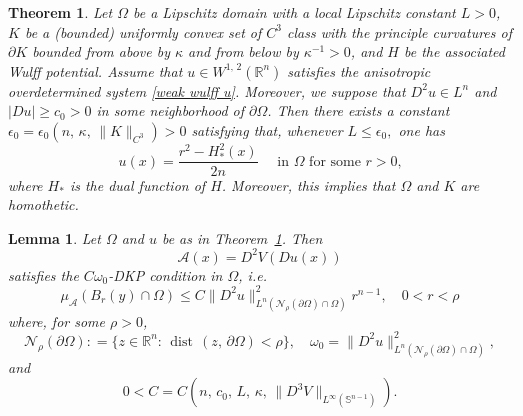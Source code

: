 \documentclass[10pt,a4paper]{amsart}
\newtheorem{thm}{Theorem}
\newtheorem{lem}{Lemma}
\def\dist{{\mathop\mathrm{\,dist\,}}}
\def\ez{\epsilon}
\begin{document}
\begin{thm}\label{main thm 2}
    Let $\Omega$ be a Lipschitz domain with a local Lipschitz constant $L>0$, $K$ be a (bounded) uniformly convex set of $C^{3}$ class with the principle curvatures of $\partial K$ bounded from above by $\kappa$ and from below by $\kappa^{-1}>0$, 
    and $H$ be the associated Wulff potential.
    Assume that $u\in W^{1,\,2}(\mathbb R^n) $
    satisfies the anisotropic overdetermined system \eqref{weak wulff u}. Moreover, we suppose that $D^2u\in L^n$ and $|Du|\ge c_0>0$ in some neighborhood of $\partial \Omega$. Then there exists a constant $\ez_0=\ez_0(n,\,\kappa,\,\|K\|_{C^{3}})>0$ satisfying that, whenever
    $ L \le \ez_0,$
    one has
    $$u(x)=\frac{r^2-H_*^2(x)}{2n} \quad \text{ in  }  \Omega  \text{ for some $r>0$,}$$
where $H_*$ is the dual function of $H$. Moreover, this implies that $\Omega$ and $K$ are homothetic. 
\end{thm}

\begin{lem}\label{A DKP}
    Let $\Omega$ and $u$ be  as in Theorem~\ref{main thm 2}. Then 
    $$\mathcal A(x)= D^2V( Du(x))$$
    satisfies the $C\omega_0$-DKP condition in $\Omega$, i.e.
    $$\mu_\mathcal A(B_r(y)\cap \Omega)\le C \| D^2 u\|^{2}_{L^n(\mathcal N_\rho(\partial \Omega)\cap \Omega)}r^{n-1},\quad 0<r<\rho$$
    where, for some $\rho>0$, 
$$\mathcal N_\rho(\partial \Omega): =\{z\in \mathbb R^n\colon \dist(z,\,\partial\Omega)<\rho\}, \quad \omega_0=\|D^2u\|^2_{L^n(\mathcal N_\rho(\partial \Omega)\cap \Omega)},$$
    and
    $$0<C=C(n,\,c_0,\,L,\,\kappa,\,   \|D^3V\|_{L^\infty(\mathbb S^{n-1})}).$$
\end{lem}
\end{document}
